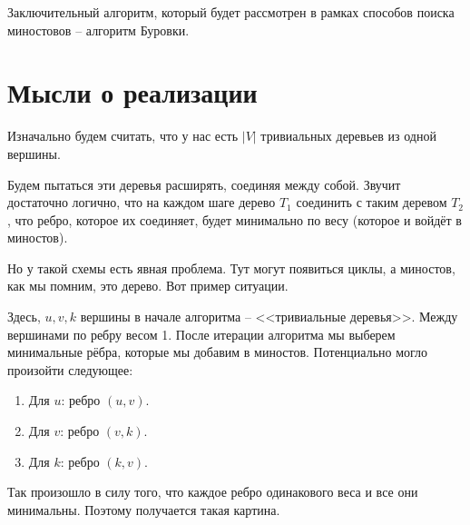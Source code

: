 Заключительный алгоритм, который будет рассмотрен в рамках способов поиска миностовов -- алгоритм Буровки.

\section{Мысли о реализации}

Изначально будем считать, что у нас есть $|V|$ тривиальных деревьев из одной вершины.

Будем пытаться эти деревья расширять, соединяя между собой. 
Звучит достаточно логично, что на каждом шаге дерево $T_1$ соединить с таким деревом $T_2$, что ребро, которое их соединяет, будет минимально по весу (которое и войдёт в миностов).

Но у такой схемы есть явная проблема. Тут могут появиться циклы, а миностов, как мы помним, это дерево. Вот пример ситуации.

\begin{figure}[H]
    \centering
\end{figure}

Здесь, $u, v, k$ вершины в начале алгоритма -- <<тривиальные деревья>>. Между вершинами по ребру весом 1. После итерации алгоритма мы выберем минимальные рёбра, которые мы добавим в миностов. 
Потенциально могло произойти следующее:
\begin{enumerate}
    \item Для $u$: ребро $(u, v)$.
    \item Для $v$: ребро $(v, k)$.
    \item Для $k$: ребро $(k, v)$.
\end{enumerate}
Так произошло в силу того, что каждое ребро одинакового веса и все они минимальны. Поэтому получается такая картина.


\begin{figure}[H]
    \centering
\end{figure}

